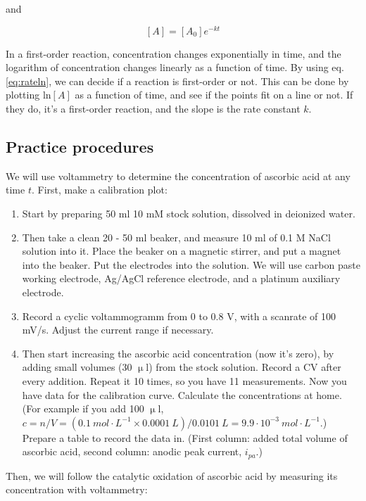 and

\begin{equation}
\label{eq:rateln}
        [A]
	=
	[A_0]
	e^{-kt}
\end{equation}

In a first-order reaction, concentration changes exponentially in time, and the logarithm of concentration changes linearly as a function of time. By using eq. \ref{eq:rateln}, we can decide if a reaction is first-order or not. This can be done by plotting ln$[A]$ as a function of time, and see if the points fit on a line or not. If they do, it's a first-order reaction, and the slope is the rate constant $k$.

\subsection{Practice procedures}
We will use voltammetry to determine the concentration of ascorbic acid at any time $t$. First, make a calibration plot:

\begin{enumerate}
\item Start by preparing 50 ml 10 mM stock solution, dissolved in deionized water.

\item Then take a clean 20 - 50 ml beaker, and measure 10 ml of 0.1 M NaCl solution into it. Place the beaker on a magnetic stirrer, and put a magnet into the beaker. Put the electrodes into the solution. We will use carbon paste working electrode, Ag/AgCl reference electrode, and a platinum auxiliary electrode.

\item Record a cyclic voltammogramm from 0 to 0.8 V, with a scanrate of 100 mV/s. Adjust the current range if necessary.

\item Then start increasing the ascorbic acid concentration (now it's zero), by adding small volumes (30 $\upmu$l) from the stock solution. Record a CV after every addition. Repeat it 10 times, so you have 11 measurements. Now you have data for the calibration curve. Calculate the concentrations at home. (For example if you add 100 $\upmu$l, $c = n/V = (0.1~mol\cdot L^{-1} \times 0.0001~L) / 0.0101~L = 9.9\cdot10^{-3}~mol\cdot L^{-1}$.) Prepare a table to record the data in. (First column: added total volume of ascorbic acid, second column: anodic peak current, $i_{pa}$.)
\end{enumerate}

Then, we will follow the catalytic oxidation of ascorbic acid by measuring its concentration with voltammetry:

